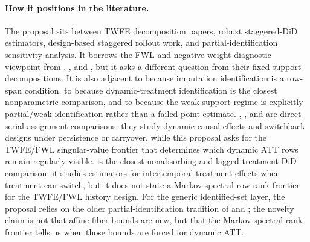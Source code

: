 \documentclass[11pt]{article}
\theoremstyle{definition}
\theoremstyle{plain}
\theoremstyle{remark}
\begin{document}
\paragraph{How it positions in the literature.}
The proposal sits between TWFE decomposition papers, robust staggered-DiD estimators, design-based staggered rollout work, and partial-identification sensitivity analysis.
It borrows the FWL and negative-weight diagnostic viewpoint from \citet{dechaisemartin2020twfe}, \citet{goodmanbacon2021timing}, and \citet{sunabraham2021eventstudy}, but it asks a different question from their fixed-support decompositions.
It is also adjacent to \citet{borusyak2024eventstudy} because imputation identification is a row-span condition, to \citet{han2021dynamic} because dynamic-treatment identification is the closest nonparametric comparison, and to \citet{rambachan2023parallel} because the weak-support regime is explicitly partial/weak identification rather than a failed point estimate.
\citet{bojinov2021panel}, \citet{bojinov2023switchback}, and \citet{hu2022switchback} are direct serial-assignment comparisons: they study dynamic causal effects and switchback designs under persistence or carryover, while this proposal asks for the TWFE/FWL singular-value frontier that determines which dynamic ATT rows remain regularly visible.
\citet{dechaisemartin2024intertemporal} is the closest nonabsorbing and lagged-treatment DiD comparison: it studies estimators for intertemporal treatment effects when treatment can switch, but it does not state a Markov spectral row-rank frontier for the TWFE/FWL history design.
For the generic identified-set layer, the proposal relies on the older partial-identification tradition of \citet{manski2003partial} and \citet{tamer2010partial}; the novelty claim is not that affine-fiber bounds are new, but that the Markov spectral rank frontier tells us when those bounds are forced for dynamic ATT.
\end{document}
